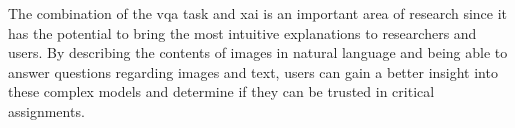     

    
    


    The combination of the \gls{vqa} task and \gls{xai} is an important area of research since it has the potential to bring the most intuitive explanations to researchers and users. By describing the contents of images in natural language and being able to answer questions regarding images and text, users can gain a better insight into these complex models and determine if they can be trusted in critical assignments. 
    

